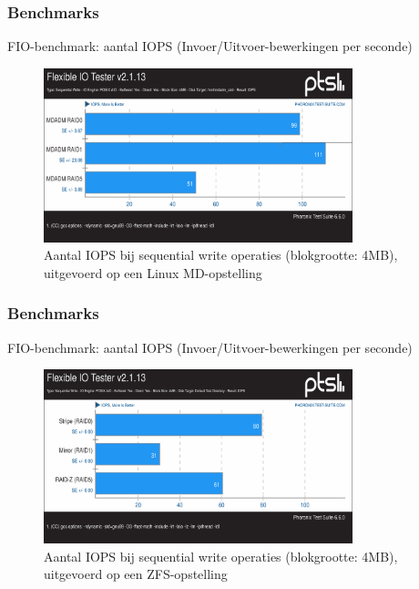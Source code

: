 \documentclass{beamer}
\begin{document}
\begin{frame}
  \frametitle{Benchmarks}
  FIO-benchmark: aantal IOPS (Invoer/Uitvoer-bewerkingen per seconde)    
  \begin{figure}
    \centering
    \includegraphics[width=0.8\textwidth]{img/Testen/FIO-4MB/fio-seqwrite-4mb-md}
    \caption{Aantal IOPS bij sequential write operaties (blokgrootte: 4MB), uitgevoerd op een Linux MD-opstelling}
  \end{figure}
\end{frame}


\begin{frame}
  \frametitle{Benchmarks}
  FIO-benchmark: aantal IOPS (Invoer/Uitvoer-bewerkingen per seconde)    
  \begin{figure}
    \centering
    \includegraphics[width=0.8\textwidth]{img/Testen/FIO-4MB/fio-seqwrite-4mb-zfs}
    \caption{Aantal IOPS bij sequential write operaties (blokgrootte: 4MB), uitgevoerd op een ZFS-opstelling}
  \end{figure}
\end{frame}


\end{document}
